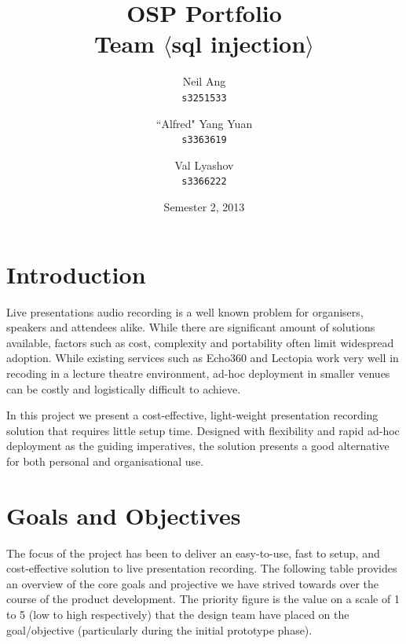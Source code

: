 \documentclass[11pt,a4paper,titlepage]{report}
\title{OSP Portfolio \\ Team $\langle$sql injection$\rangle$}
\author{
  Neil Ang\\
  \texttt{s3251533}
  \and
  ``Alfred" Yang Yuan\\
  \texttt{s3363619}
  \and
  Val Lyashov\\
  \texttt{s3366222}
}
\date{Semester 2, 2013}
\begin{document}
\maketitle

\pagebreak
\tableofcontents
\thispagestyle{empty}
\pagebreak

\section{Introduction}

Live presentations audio recording is a well known problem for organisers, speakers and attendees alike. While there are significant amount of solutions available, factors such as cost, complexity and portability often limit widespread adoption. While existing services such as Echo360 and Lectopia work very well in recoding in a lecture theatre environment, ad-hoc deployment in smaller venues can be costly and logistically difficult to achieve.
 
In this project we present a cost-effective, light-weight presentation recording solution that requires little setup time. Designed with flexibility and rapid ad-hoc deployment as the guiding imperatives, the solution presents a good alternative for both personal and organisational use.


\section{Goals and Objectives}


The focus of the project has been to deliver an easy-to-use, fast to setup, and cost-effective solution to live presentation recording. The following table provides an overview of the core goals and projective we have strived towards over the course of the product development. The priority figure is the value on a scale of 1 to 5 (low to high respectively) that the design team have placed on the goal/objective (particularly during the initial prototype phase).
\end{document}
